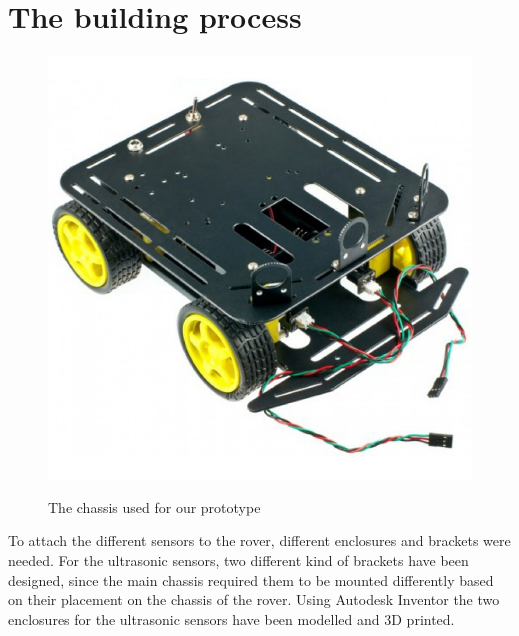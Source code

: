 \clearpage
\section{The building process}

\begin{figure}[H]
	\centering
	\includegraphics[width=.4\linewidth]{images/chassis.jpg}
	\label{fig:chassis}
	\caption{The chassis used for our prototype}
\end{figure}

To attach the different sensors to the rover, different enclosures and brackets were needed. For the ultrasonic sensors, two different kind of brackets have been designed, since the main chassis required them to be mounted differently based on their placement on the chassis of the rover. Using Autodesk Inventor the two enclosures for the ultrasonic sensors have been modelled and 3D printed.

